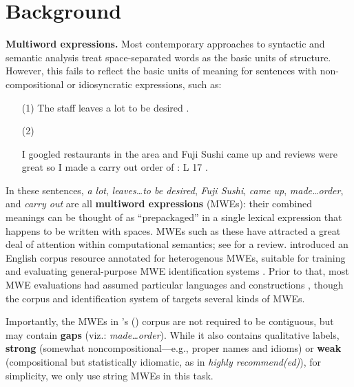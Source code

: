 \documentclass[11pt,letterpaper]{article}
\newcommand{\citeposs}[1]{\citeauthor{#1}'s (\citeyear{#1})}
\newcommand{\lex}[1]{\textit{#1}} %
\begin{document}
\section{Background}
\textbf{Multiword expressions.} 
Most contemporary approaches to syntactic and semantic analysis
treat space-separated words as the basic units of structure. 
However, this fails to reflect 
the basic units of meaning for sentences with non-compositional or idiosyncratic expressions, such as:
\begin{itemize}[labelindent=2em]
\item[(1)] The staff {\color{red}leaves} {\color{blue}a lot} {\color{red}to be desired} .
\item[(2)] \raggedright I googled restaurants in the area and {\color{red}Fuji Sushi} {\color{blue}came up} and reviews were great so I {\color{mdgreen}made a} {\color{orange}carry out} {\color{mdgreen}order} of : L 17 .
\end{itemize}
In these sentences, \lex{a lot}, \lex{leaves\ldots to be desired}, 
\lex{Fuji Sushi}, \lex{came up}, \lex{made\ldots order}, and \lex{carry out}
are all \textbf{multiword expressions} (MWEs): their combined meanings can be thought of as ``prepackaged'' 
in a single lexical expression that happens to be written with spaces.
MWEs such as these have attracted a great deal of attention 
within computational semantics; see \citet{baldwin-10} for a review.
 introduced an English corpus resource annotated for heterogenous MWEs, 
suitable for training and evaluating general-purpose MWE identification systems \citep{schneider-14}.
Prior to that, most MWE evaluations had assumed  particular languages and constructions \citep[recently:][]{constant-11,green-12,ramisch-12,vincze-13},
though the corpus and identification system of \citet{vincze-11} targets several kinds of MWEs.

Importantly, the MWEs in \citeposs{schneider-14-corpus} corpus are not required to be contiguous, 
but may contain \textbf{gaps} (viz.: \lex{made\ldots order}). 
While it also contains qualitative labels, \textbf{strong} 
(somewhat noncompositional---e.g., proper names and idioms) 
or \textbf{weak} (compositional but statistically idiomatic, as in \lex{highly recommend(ed)}), for simplicity, we only use string MWEs in this task.
\end{document}
